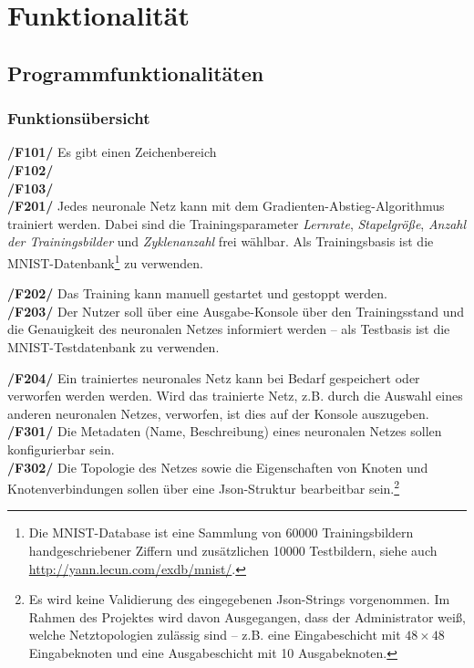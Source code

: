 \section{Funktionalität}

\subsection{Programmfunktionalitäten}
\subsubsection{Funktionsübersicht}

\textbf{/F101/} Es gibt einen Zeichenbereich \\[-0.2cm]

\textbf{/F102/}\\[-0.2cm]

\textbf{/F103/}\\[-0.2cm]

\textbf{/F201/} Jedes neuronale Netz kann mit dem Gradienten-Abstieg-Algorithmus trainiert werden. Dabei sind die Trainingsparameter \emph{Lernrate}, \emph{Stapelgröße}, \emph{Anzahl der Trainingsbilder} und \emph{Zyklenanzahl} frei wählbar. Als Trainingsbasis ist die MNIST-Datenbank\footnote{Die MNIST-Database ist eine Sammlung von 60000 Trainingsbildern handgeschriebener Ziffern und zusätzlichen 10000 Testbildern, siehe auch \url{http://yann.lecun.com/exdb/mnist/}.} zu verwenden.

\textbf{/F202/} Das Training kann manuell gestartet und gestoppt werden.\\[-0.2cm]

\textbf{/F203/} Der Nutzer soll über eine Ausgabe-Konsole über den Trainingsstand und die Genauigkeit des neuronalen Netzes informiert werden -- als Testbasis ist die MNIST-Testdatenbank zu verwenden.

\textbf{/F204/} Ein trainiertes neuronales Netz kann bei Bedarf gespeichert oder verworfen werden werden. Wird das trainierte Netz, z.B. durch die Auswahl eines anderen neuronalen Netzes, verworfen, ist dies auf der Konsole auszugeben. \\[-0.2cm]

\textbf{/F301/} Die Metadaten (Name, Beschreibung) eines neuronalen Netzes sollen konfigurierbar sein.\\[-0.2cm]

\textbf{/F302/} Die Topologie des Netzes sowie die Eigenschaften von Knoten und Knotenverbindungen sollen über eine Json-Struktur bearbeitbar sein.\footnote{Es wird keine Validierung des eingegebenen Json-Strings vorgenommen. Im Rahmen des Projektes wird davon Ausgegangen, dass der Administrator weiß, welche Netztopologien zulässig sind -- z.B. eine Eingabeschicht mit $48 \times 48$ Eingabeknoten und eine Ausgabeschicht mit 10 Ausgabeknoten.}\\[-0.2cm]

